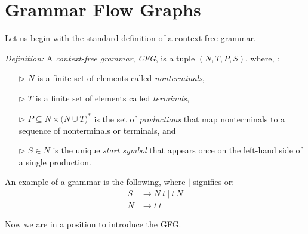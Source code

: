 \documentclass{sigplanconf}
\begin{document}
\section{Grammar Flow Graphs}

Let us begin with the standard definition of a context-free grammar.

\textit{Definition:} A \textit{context-free grammar}, \textit{CFG}, is a tuple $(N, T, P, S)$, where, \cite{bilardi-pingali}:
\begin{itemize}
\item[$\triangleright$] $N$ is a finite set of elements called \textit{nonterminals}, 
\item[$\triangleright$] $T$ is a finite set of elements called \textit{terminals}, 
\item[$\triangleright$] $P\subseteq{N\times{(N\cup{T}}})^*$ is the set of \textit{productions} that map nonterminals to a sequence of nonterminals or terminals, and 
\item[$\triangleright$] $S\in{N}$ is the unique \textit{start symbol} that appears once on the left-hand side of a single production.
\end{itemize}

An example of a grammar is the following, where $|$ signifies or:
\begin{align*}
S&\longrightarrow{N \: t \: | \: t \: N} \\
N&\longrightarrow{t \: t}
\end{align*}

Now we are in a position to introduce the GFG.
\end{document}
